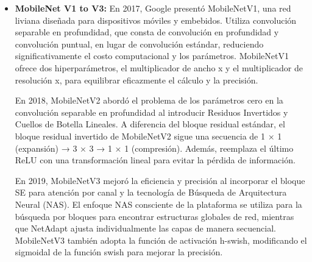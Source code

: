\begin{itemize}
  \item \textbf{MobileNet V1 to V3:} En 2017, Google presentó MobileNetV1, una red liviana diseñada para dispositivos móviles y embebidos. Utiliza convolución separable en profundidad, que consta de convolución en profundidad y convolución puntual, en lugar de convolución estándar, reduciendo significativamente el costo computacional y los parámetros. MobileNetV1 ofrece dos hiperparámetros, el multiplicador de ancho x y el multiplicador de resolución x, para equilibrar eficazmente el cálculo y la precisión.
  
  En 2018, MobileNetV2 abordó el problema de los parámetros cero en la convolución separable en profundidad al introducir Residuos Invertidos y Cuellos de Botella Lineales. A diferencia del bloque residual estándar, el bloque residual invertido de MobileNetV2 sigue una secuencia de 1 × 1 (expansión) → 3 × 3 → 1 × 1 (compresión). Además, reemplaza el último ReLU con una transformación lineal para evitar la pérdida de información.
  
  En 2019, MobileNetV3 mejoró la eficiencia y precisión al incorporar el bloque SE para atención por canal y la tecnología de Búsqueda de Arquitectura Neural (NAS). El enfoque NAS consciente de la plataforma se utiliza para la búsqueda por bloques para encontrar estructuras globales de red, mientras que NetAdapt ajusta individualmente las capas de manera secuencial. MobileNetV3 también adopta la función de activación h-swish, modificando el sigmoidal de la función swish para mejorar la precisión.
  

\end{itemize}

